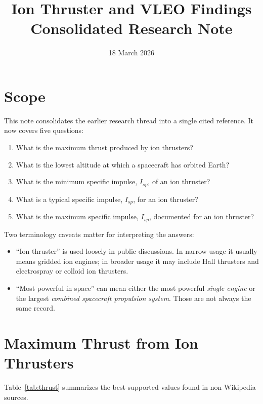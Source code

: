\documentclass[11pt]{article}
\title{Ion Thruster and VLEO Findings\\\large Consolidated Research Note}
\author{}
\date{18 March 2026}
\begin{document}
\maketitle

\section{Scope}

This note consolidates the earlier research thread into a single cited reference.
It now covers five questions:

\begin{enumerate}
    \item What is the maximum thrust produced by ion thrusters?
    \item What is the lowest altitude at which a spacecraft has orbited Earth?
    \item What is the minimum specific impulse, $I_{sp}$, of an ion thruster?
    \item What is a typical specific impulse, $I_{sp}$, for an ion thruster?
    \item What is the maximum specific impulse, $I_{sp}$, documented for an ion thruster?
\end{enumerate}

Two terminology caveats matter for interpreting the answers:

\begin{itemize}
    \item ``Ion thruster'' is used loosely in public discussions. In narrow usage it usually means gridded ion engines; in broader usage it may include Hall thrusters and electrospray or colloid ion thrusters.
    \item ``Most powerful in space'' can mean either the most powerful \emph{single engine} or the largest \emph{combined spacecraft propulsion system}. Those are not always the same record.
\end{itemize}

\section{Maximum Thrust from Ion Thrusters}

Table~\ref{tab:thrust} summarizes the best-supported values found in non-Wikipedia sources.
\end{document}
